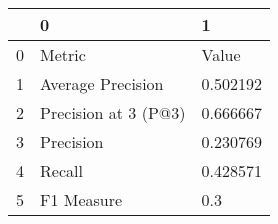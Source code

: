 \begin{tabular}{lll}
\toprule
{} &                     0 &         1 \\
\midrule
0 &                Metric &     Value \\
1 &     Average Precision &  0.502192 \\
2 &  Precision at 3 (P@3) &  0.666667 \\
3 &             Precision &  0.230769 \\
4 &                Recall &  0.428571 \\
5 &            F1 Measure &       0.3 \\
\bottomrule
\end{tabular}
